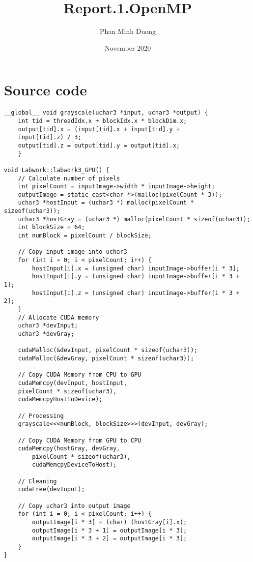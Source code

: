 \documentclass{article}
\title{Report.1.OpenMP}
\author{Phan Minh Duong}
\date{November 2020}
\begin{document}
\maketitle

\section{Source code}
\begin{verbatim}
__global__ void grayscale(uchar3 *input, uchar3 *output) {
    int tid = threadIdx.x + blockIdx.x * blockDim.x;
    output[tid].x = (input[tid].x + input[tid].y +
    input[tid].z) / 3;
    output[tid].z = output[tid].y = output[tid].x;
    }

void Labwork::labwork3_GPU() {
    // Calculate number of pixels
    int pixelCount = inputImage->width * inputImage->height;
    outputImage = static_cast<char *>(malloc(pixelCount * 3));
    uchar3 *hostInput = (uchar3 *) malloc(pixelCount * sizeof(uchar3));
    uchar3 *hostGray = (uchar3 *) malloc(pixelCount * sizeof(uchar3));
    int blockSize = 64;
    int numBlock = pixelCount / blockSize;

    // Copy input image into uchar3
    for (int i = 0; i < pixelCount; i++) {
        hostInput[i].x = (unsigned char) inputImage->buffer[i * 3];
        hostInput[i].y = (unsigned char) inputImage->buffer[i * 3 + 1];
        hostInput[i].z = (unsigned char) inputImage->buffer[i * 3 + 2];
    }
    // Allocate CUDA memory  
    uchar3 *devInput;
    uchar3 *devGray;

    cudaMalloc(&devInput, pixelCount * sizeof(uchar3));
    cudaMalloc(&devGray, pixelCount * sizeof(uchar3));

    // Copy CUDA Memory from CPU to GPU
    cudaMemcpy(devInput, hostInput,
    pixelCount * sizeof(uchar3),
    cudaMemcpyHostToDevice);

    // Processing
    grayscale<<<numBlock, blockSize>>>(devInput, devGray);

    // Copy CUDA Memory from GPU to CPU
    cudaMemcpy(hostGray, devGray,
        pixelCount * sizeof(uchar3),
        cudaMemcpyDeviceToHost);

    // Cleaning
    cudaFree(devInput);

    // Copy uchar3 into output image
    for (int i = 0; i < pixelCount; i++) {
        outputImage[i * 3] = (char) (hostGray[i].x);
        outputImage[i * 3 + 1] = outputImage[i * 3];
        outputImage[i * 3 + 2] = outputImage[i * 3];
    }
}
\end{verbatim}
\end{document}
